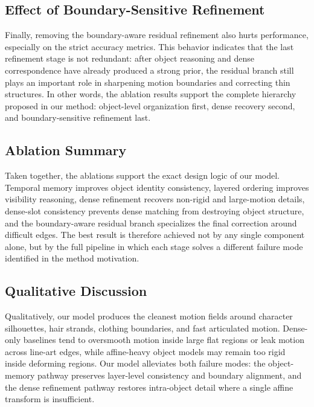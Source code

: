 \subsection{Effect of Boundary-Sensitive Refinement}

Finally, removing the boundary-aware residual refinement also hurts performance, especially on the strict accuracy metrics. This behavior indicates that the last refinement stage is not redundant: after object reasoning and dense correspondence have already produced a strong prior, the residual branch still plays an important role in sharpening motion boundaries and correcting thin structures. In other words, the ablation results support the complete hierarchy proposed in our method: object-level organization first, dense recovery second, and boundary-sensitive refinement last.

\subsection{Ablation Summary}

Taken together, the ablations support the exact design logic of our model. Temporal memory improves object identity consistency, layered ordering improves visibility reasoning, dense refinement recovers non-rigid and large-motion details, dense-slot consistency prevents dense matching from destroying object structure, and the boundary-aware residual branch specializes the final correction around difficult edges. The best result is therefore achieved not by any single component alone, but by the full pipeline in which each stage solves a different failure mode identified in the method motivation.

\subsection{Qualitative Discussion}

Qualitatively, our model produces the cleanest motion fields around character silhouettes, hair strands, clothing boundaries, and fast articulated motion. Dense-only baselines tend to oversmooth motion inside large flat regions or leak motion across line-art edges, while affine-heavy object models may remain too rigid inside deforming regions. Our model alleviates both failure modes: the object-memory pathway preserves layer-level consistency and boundary alignment, and the dense refinement pathway restores intra-object detail where a single affine transform is insufficient.

